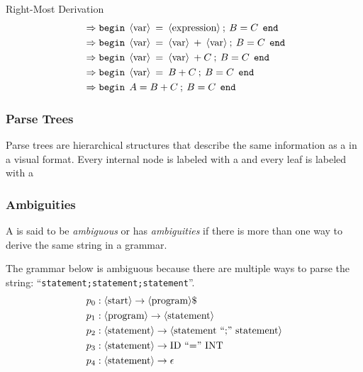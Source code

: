 \begin{example}[]{Right-Most Derivation}
\begin{align*}
                          &\Rightarrow \mathtt{begin} \:\: \langle \text{var} \rangle \: = \: \langle \text{expression} \rangle \: ; \: B = C \:\: \mathtt{end} \\
                          &\Rightarrow \mathtt{begin} \:\: \langle \text{var} \rangle \: = \: \langle \text{var} \rangle \: + \: \langle \text{var} \rangle \: ; \: B = C \:\: \mathtt{end} \\
                          &\Rightarrow \mathtt{begin} \:\: \langle \text{var} \rangle \: = \: \langle \text{var} \rangle \: + C \: ; \: B = C \:\: \mathtt{end} \\
                          &\Rightarrow \mathtt{begin} \:\: \langle \text{var} \rangle \: = \: B + C \: ; \: B = C \:\: \mathtt{end} \\
                          &\Rightarrow \mathtt{begin} \:\: A = B + C\: ; \: B = C \:\: \mathtt{end} 
  \end{align*}
\end{example}

\subsubsection{Parse Trees}\label{subsubsec:Parse_Trees}
Parse trees are hierarchical structures that describe the same information as a  in a visual format.
Every internal node is labeled with a  and every leaf is labeled with a 

\subsubsection{Ambiguities}\label{subsubsec:Ambiguities}
\begin{definition}[Ambiguous]\label{def:Ambiguous}
  A  is said to be \emph{ambiguous} or has \emph{ambiguities} if there is more than one way to derive the same string in a grammar.

  The grammar below is ambiguous because there are multiple ways to parse the string: ``\texttt{statement;statement;statement}''.
  \begin{equation}\label{eq:Ambiguous}
    \begin{aligned}
      p_{0} &: \langle \text{start} \rangle \rightarrow \langle \text{program} \rangle \$ \\
      p_{1} &: \langle \text{program} \rangle \rightarrow \langle \text{statement} \rangle \\
      p_{2} &: \langle \text{statement} \rangle \rightarrow \langle \text{statement ``;'' statement} \rangle \\
      p_{3} &: \langle \text{statement} \rangle \rightarrow \text{ID ``='' INT} \\
      p_{4} &: \langle \text{statement} \rangle \rightarrow \epsilon \\
    \end{aligned}
  \end{equation}
\end{definition}

